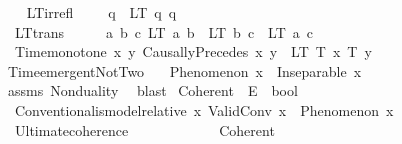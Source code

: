 \begin{isabellebody}
\isanewline
{}\isamarkupfalse%
\ \isanewline
\ \ LT{\isacharunderscore}{\kern0pt}irrefl{\isacharcolon}{\kern0pt}\ \ \ \ \ {\isachardoublequoteopen}{\isasymforall}q{\isachardot}{\kern0pt}\ {\isasymnot}\ LT\ q\ q{\isachardoublequoteclose}\ \isanewline
\ \ LT{\isacharunderscore}{\kern0pt}trans{\isacharcolon}{\kern0pt}\ \ \ \ \ \ {\isachardoublequoteopen}{\isasymforall}a\ b\ c{\isachardot}{\kern0pt}\ LT\ a\ b\ {\isasymand}\ LT\ b\ c\ {\isasymlongrightarrow}\ LT\ a\ c{\isachardoublequoteclose}\ \isanewline
\ \ Time{\isacharunderscore}{\kern0pt}monotone{\isacharcolon}{\kern0pt}\ {\isachardoublequoteopen}{\isasymforall}x\ y{\isachardot}{\kern0pt}\ CausallyPrecedes\ x\ y\ {\isasymlongrightarrow}\ LT\ {\isacharparenleft}{\kern0pt}T\ x{\isacharparenright}{\kern0pt}\ {\isacharparenleft}{\kern0pt}T\ y{\isacharparenright}{\kern0pt}{\isachardoublequoteclose}\isanewline
\isanewline
{}\isamarkupfalse%
\ Time{\isacharunderscore}{\kern0pt}emergent{\isacharunderscore}{\kern0pt}NotTwo{\isacharcolon}{\kern0pt}\isanewline
\ \ \ {\isachardoublequoteopen}Phenomenon\ x{\isachardoublequoteclose}\ \ {\isachardoublequoteopen}Inseparable\ x\ {\isasymOmega}{\isachardoublequoteclose}\isanewline
%
\isadelimproof
\ \ %
\endisadelimproof
%
\isatagproof
{}\isamarkupfalse%
\ assms\ Nonduality\ \isamarkupfalse%
\ blast%
\endisatagproof
{\isafoldproof}%
%
\isadelimproof
%
\endisadelimproof
%
\isadelimdocument
%
\endisadelimdocument
%
\isatagdocument
%
\isamarkuptrue%
%
\endisatagdocument
{\isafolddocument}%
%
\isadelimdocument
%
\endisadelimdocument
{}\isamarkupfalse%
\ Coherent\ {\isacharcolon}{\kern0pt}{\isacharcolon}{\kern0pt}\ {\isachardoublequoteopen}E\ {\isasymRightarrow}\ bool{\isachardoublequoteclose}\isanewline
\isanewline
{}\isamarkupfalse%
\ \isanewline
\ \ Conventional{\isacharunderscore}{\kern0pt}is{\isacharunderscore}{\kern0pt}model{\isacharunderscore}{\kern0pt}relative{\isacharcolon}{\kern0pt}\ {\isachardoublequoteopen}{\isasymforall}x{\isachardot}{\kern0pt}\ ValidConv\ x\ {\isasymlongrightarrow}\ Phenomenon\ x{\isachardoublequoteclose}\ \isanewline
\ \ Ultimate{\isacharunderscore}{\kern0pt}coherence{\isacharcolon}{\kern0pt}\ \ \ \ \ \ \ \ \ \ \ \ \ {\isachardoublequoteopen}Coherent\ {\isasymOmega}{\isachardoublequoteclose}%
\isadelimdocument
%
\endisadelimdocument

\end{isabellebody}
